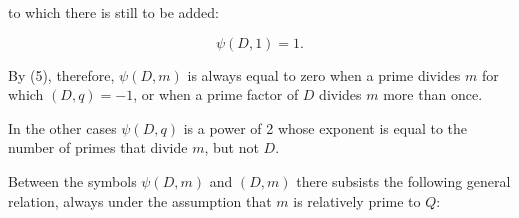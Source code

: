 to which there is still to be added:

\[ \psi(D,1)=1. \]

By (5), therefore, $\psi(D,m)$ is always equal to zero when
a prime divides $m$ for which $(D,q)=-1$, or when
a prime factor of $D$ divides $m$ more than once.

In the other cases $\psi(D,q)$ is a power of 2 %
 whose
exponent is equal to the number of primes that divide $m$, but
 not $D$.

Between the symbols $\psi(D,m)$ and $(D,m)$ there subsists the
following general relation, always under the assumption
that $m$ is relatively prime to $Q$:
